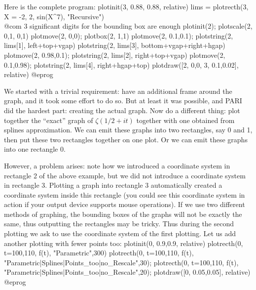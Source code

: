 Here is the complete program:
\bprog
  plotinit(3, 0.88, 0.88, relative)
  lims = plotrecth(3, X = -2, 2, sin(X^7), "Recursive")
            \\ @com $3$ significant digits for the bounding box are enough
  plotinit(2);      plotscale(2, 0,1, 0,1)
  plotmove(2, 0,0); plotbox(2, 1,1)
  plotmove(2, 0.1,0.1);
  plotstring(2, lims[1], left+top+vgap)
  plotstring(2, lims[3], bottom+vgap+right+hgap)
  plotmove(2, 0.98,0.1); plotstring(2, lims[2], right+top+vgap)
  plotmove(2, 0.1,0.98); plotstring(2, lims[4], right+hgap+top)
  plotdraw([2, 0,0,  3, 0.1,0.02], relative)
@eprog

We started with a trivial requirement: have an additional frame around
the graph, and it took some effort to do so.  But at least it was possible,
and PARI did the hardest part: creating the actual graph.
Now do a different thing: plot together the ``exact'' graph of
$\zeta({1/2}+it)$ together with one obtained from splines approximation.
We can emit these graphs into two rectangles, say 0 and 1, then put these
two rectangles together on one plot.  Or we can emit these graphs into one
rectangle 0.

However, a problem arises: note how we
introduced a coordinate system in rectangle 2 of the above example, but we
did not introduce a coordinate system in rectangle 3.  Plotting a
graph into rectangle 3 automatically created a coordinate system
inside this rectangle (you could see this coordinate system in action
if your output device supports mouse operations).  If we use two different
methods of graphing, the bounding boxes of the graphs will not be exactly
the same, thus outputting the rectangles may be tricky.  Thus during
the second plotting we ask  to use the coordinate system of
the first plotting.  Let us add another plotting with fewer
points too:
\bprog
plotinit(0, 0.9,0.9, relative)
plotrecth(0, t=100,110, f(t), "Parametric",300)
plotrecth(0, t=100,110, f(t), "Parametric|Splines|Points_too|no_Rescale",30);
plotrecth(0, t=100,110, f(t), "Parametric|Splines|Points_too|no_Rescale",20);
plotdraw([0, 0.05,0.05], relative)
@eprog

